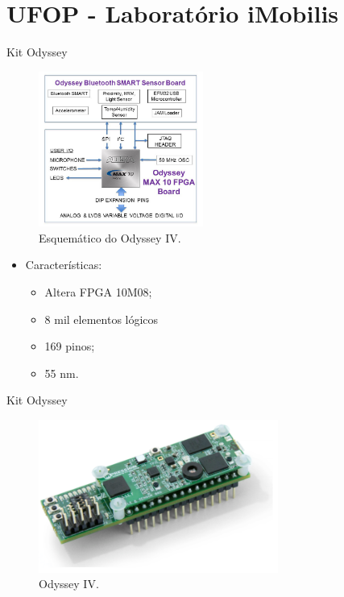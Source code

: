 
\section{UFOP - Laboratório iMobilis}
	\begin{frame}{Kit Odyssey}
        \vspace{-1em}
		\begin{multicols}{2}
				\begin{figure}[h]
					\centering
					\includegraphics[width=0.48\textwidth]{img/imobilis/odyssey-esquematico.jpg}
					\caption{Esquemático do Odyssey IV.}
					\label{fig:odyssey-esquematico}
				\end{figure}
			\columnbreak
				\begin{itemize}
					\item Características:
					\begin{itemize}
						\setlength\itemsep{1em}
						\item Altera FPGA 10M08;
						\item 8 mil elementos lógicos
						\item 169 pinos;
						\item 55 nm.
					\end{itemize}
				\end{itemize}
		\end{multicols}
	\end{frame}

	\begin{frame}{Kit Odyssey}
		\begin{figure}[h]
			\centering
			\includegraphics[width=0.7\textwidth]{img/imobilis/odyssey-foto.png}
			\caption{Odyssey IV.}
			\label{fig:odyssey-foto}
		\end{figure}
	\end{frame}


